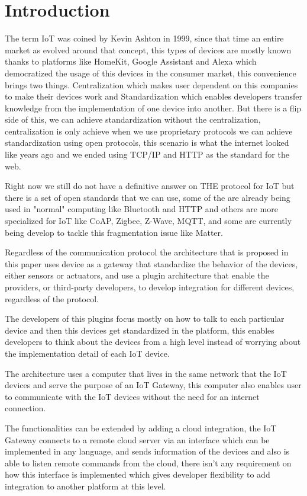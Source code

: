 \section{Introduction}
The term IoT was coined by Kevin Ashton in 1999, since that time an entire 
market as evolved around that concept, this types of devices are mostly known 
thanks to platforms like HomeKit, Google Assistant and Alexa which democratized 
the usage of this devices in the consumer market, this convenience brings two 
things. Centralization which makes user dependent on this companies to make 
their devices work and Standardization which enables developers transfer 
knowledge from the implementation of one device into another. But there is a 
flip side of this, we can achieve standardization without the centralization, 
centralization is only achieve when we use proprietary protocols we can achieve 
standardization using open protocols, this scenario is what the internet looked 
like years ago and we ended using TCP/IP and HTTP as the standard for the web.

Right now we still do not have a definitive answer on THE protocol for IoT but 
there is a set of open standards that we can use, some of the are already being
 used in "normal" computing like Bluetooth and HTTP and others are more 
 specialized for IoT like CoAP, Zigbee, Z-Wave, MQTT, and some are currently 
 being develop to tackle this fragmentation issue like Matter.

Regardless of the communication protocol the architecture that is proposed in 
this paper uses device as a gateway that standardize the behavior of the 
devices, either sensors or actuators, and use a plugin architecture that enable 
the providers, or third-party developers, to develop integration for different 
devices, regardless of the protocol.

The developers of this plugins focus mostly on how to talk to each particular 
device and then this devices get standardized in  the platform, this enables 
developers to think about the devices from a high level instead of worrying 
about the implementation detail of each IoT device.

The architecture uses a computer that lives in the same network that the IoT 
devices and serve the purpose of an IoT Gateway, this computer also enables 
user to communicate with the IoT devices without the need for an internet 
connection. 

The functionalities can be extended by adding a cloud integration, the IoT 
Gateway connects to a remote cloud server via an interface which can be 
implemented in any language, and sends information of the devices and also is 
able to listen remote commands from the cloud, there isn't any requirement on 
how this interface is implemented which gives developer flexibility to add 
integration to another platform at this level.

